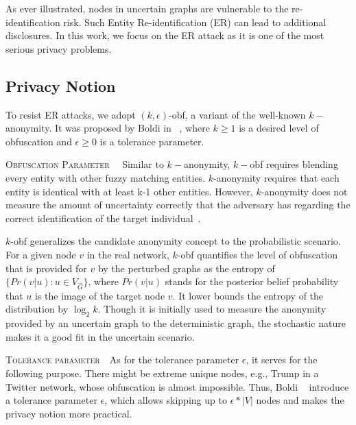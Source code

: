 As ever illustrated, nodes in uncertain graphs are vulnerable to the re-identification risk. Such Entity Re-identification (ER) can lead to additional disclosures. In this work, we focus on the ER attack as it is one of the most serious privacy problems. 
\subsection{Privacy Notion}
\label{sec:privacyNotion}
To resist ER attacks, we adopt $(k,\epsilon)$-obf, a variant of the well-known $k-$anonymity. It was proposed by Boldi {\etal} in ~\cite{Boldi_Injecting_2012}, where $k \ge 1$ is a desired level of obfuscation and $\epsilon \ge 0$ is a tolerance parameter. 

\textsc{Obfuscation Parameter}~~
Similar to $k-$anonymity, $k-$obf requires blending every entity with other fuzzy matching entities. 
$k$-anonymity requires that each entity is identical with at least k-1 other entities. 
However, $k$-anonymity does not measure the amount of uncertainty correctly that the adversary has regarding the correct identification of the target individual~\cite{Bonchi_Identity_2014}. 

$k$-obf generalizes the candidate anonymity concept to the probabilistic scenario. 
For a given node $v$ in the real network, $k$-obf quantifies the level of obfuscation that is provided for $v$ by the perturbed graphs as the entropy of $\lbrace Pr(v|u) : u \in V_{\hat{G}}  \rbrace$, where $Pr(v|u)$ stands for the posterior belief probability that $u$ is the image of the target node $v$. 
It lower bounds the entropy of the distribution by $\log_{2}k$.
Though it is initially used to measure the anonymity provided by an uncertain graph to the deterministic graph, the stochastic nature makes it a good fit in the uncertain scenario. 

\textsc{Tolerance parameter}~~As for the tolerance parameter $\epsilon$, it serves for the following purpose. There might be extreme unique nodes, e.g., Trump in a Twitter network, whose obfuscation is almost impossible. Thus, Boldi {\etal}~\cite{Boldi_Injecting_2012} introduce a tolerance parameter $\epsilon$, which allows skipping up to $\epsilon * |V|$ nodes and makes the privacy notion more practical. 
